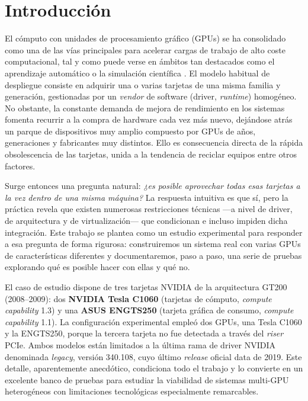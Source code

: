 \chapter*{Introducción} \label{resumen}

El cómputo con unidades de procesamiento gráfico (GPUs) se ha consolidado como una de las vías principales para acelerar cargas de trabajo de alto coste computacional, tal y como puede verse en ámbitos tan destacados como el aprendizaje automático o la simulación científica \cite{ibm_hpc}. El modelo habitual de despliegue consiste en adquirir una o varias tarjetas de una misma familia y generación, gestionadas por un \textit{vendor} de software (driver, \textit{runtime}) homogéneo. No obstante,
la constante demanda de mejora de rendimiento en los sistemas fomenta recurrir a la compra de hardware cada vez
 más nuevo, dejándose atrás un parque de dispositivos muy amplio compuesto por GPUs de años, generaciones y fabricantes 
 muy distintos. Ello es consecuencia directa de la rápida obsolescencia de las tarjetas, unida a la tendencia de 
 reciclar equipos entre otros factores.

Surge entonces una pregunta natural: \emph{¿es posible aprovechar todas esas tarjetas a la vez dentro de una misma máquina?} La respuesta intuitiva es que sí, pero la práctica revela que existen numerosas restricciones técnicas ---a nivel de driver, de arquitectura y de virtualización--- que condicionan e incluso impiden dicha integración. Este trabajo se plantea como un estudio experimental para responder a esa pregunta de forma rigurosa: construiremos un sistema real con varias GPUs de características diferentes y documentaremos, paso a paso, una serie de pruebas explorando qué es posible hacer con ellas y qué no.

El caso de estudio dispone de tres tarjetas NVIDIA de la arquitectura GT200 (2008--2009): dos \textbf{NVIDIA Tesla C1060} (tarjetas de cómputo, \textit{compute capability} 1.3) y una \textbf{ASUS ENGTS250} (tarjeta gráfica de consumo, \textit{compute capability} 1.1). La configuración experimental empleó dos GPUs, una Tesla C1060 y la ENGTS250, porque la tercera tarjeta no fue detectada a través del \textit{riser} PCIe. Ambos modelos están limitados a la última rama de driver NVIDIA denominada \textit{legacy}, 
versión 340.108, cuyo último \textit{release} oficial data de 2019. Este detalle, aparentemente anecdótico, condiciona todo el trabajo y lo convierte en un excelente banco de pruebas para estudiar la viabilidad de sistemas multi-GPU heterogéneos con limitaciones tecnológicas especialmente remarcables.

